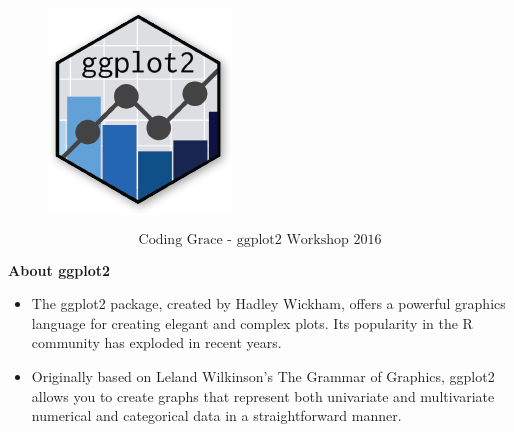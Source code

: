 \documentclass{beamer}
\begin{document}


\begin{frame}
	\begin{figure}
\centering
\includegraphics[width=0.45\linewidth]{ggplot2-official-hexbin-logo}
\end{figure}
\large
\[\mbox{Coding Grace - ggplot2 Workshop 2016}\]



\end{frame}


\begin{frame}
	\Large
	\noindent\textbf{About ggplot2}
	\bigskip
	\begin{itemize}
\item The ggplot2 package, created by Hadley Wickham, offers a powerful graphics language for creating elegant and complex plots. Its popularity in the R community has exploded in recent years. 
\item Originally based on Leland Wilkinson's The Grammar of Graphics, ggplot2 allows you to create graphs that represent both univariate and multivariate numerical and categorical data in a straightforward manner.
	\end{itemize}

\end{frame}
\end{document}
